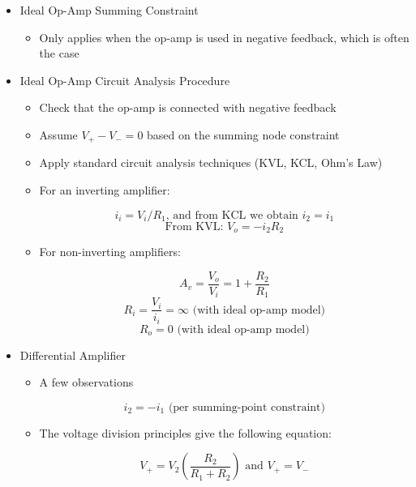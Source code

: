 \begin{itemize}

  \item Ideal Op-Amp Summing Constraint

    \begin{itemize}

      \item Only applies when the op-amp is used in negative feedback, which is often the case

    \end{itemize}

  \item Ideal Op-Amp Circuit Analysis Procedure

    \begin{itemize}

      \item Check that the op-amp is connected with negative feedback

      \item Assume $V_+-V_-=0$ based on the summing node constraint

      \item Apply standard circuit analysis techniques (KVL, KCL, Ohm's Law)

      \item For an inverting amplifier:

        $$i_i=V_{i}/R_1\text{, and from KCL we obtain }i_2=i_1$$
        $$\text{From KVL: }V_o=-i_2R_2$$

      \item For non-inverting amplifiers:

        $$A_v=\frac{V_o}{V_i}=1+\frac{R_2}{R_1}$$
        $$R_i=\frac{V_i}{i_i}=\infty\text{ (with ideal op-amp model)}$$
        $$R_o=0\text{ (with ideal op-amp model)}$$

    \end{itemize}

  \item Differential Amplifier

    \begin{itemize}

      \item A few observations

        $$i_2=-i_1\text{ (per summing-point constraint)}$$

      \item The voltage division principles give the following equation:

        $$V_+=V_2\left( \frac{R_2}{R_1+R_2} \right)\text{ and }V_+=V_-$$


\end{itemize}
\end{itemize}
